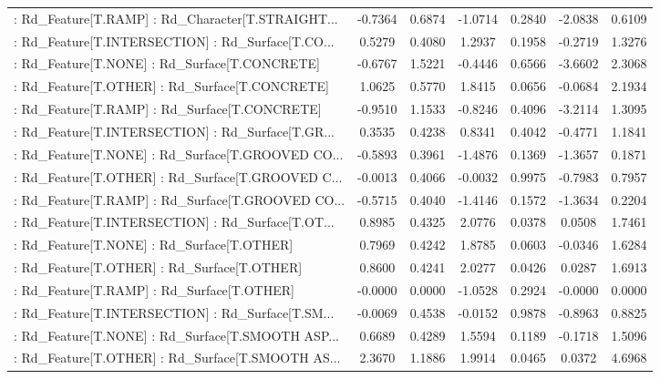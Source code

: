 \begin{longtable}{p{4cm}cccccc}
 : Rd\_Feature[T.RAMP] : Rd\_Character[T.STRAIGHT... & -0.7364 &    0.6874 & -1.0714 &       0.2840 & -2.0838 &  0.6109 \\
 : Rd\_Feature[T.INTERSECTION] : Rd\_Surface[T.CO... &  0.5279 &    0.4080 &  1.2937 &       0.1958 & -0.2719 &  1.3276 \\
 : Rd\_Feature[T.NONE] : Rd\_Surface[T.CONCRETE]     & -0.6767 &    1.5221 & -0.4446 &       0.6566 & -3.6602 &  2.3068 \\
 : Rd\_Feature[T.OTHER] : Rd\_Surface[T.CONCRETE]    &  1.0625 &    0.5770 &  1.8415 &       0.0656 & -0.0684 &  2.1934 \\
 : Rd\_Feature[T.RAMP] : Rd\_Surface[T.CONCRETE]     & -0.9510 &    1.1533 & -0.8246 &       0.4096 & -3.2114 &  1.3095 \\
 : Rd\_Feature[T.INTERSECTION] : Rd\_Surface[T.GR... &  0.3535 &    0.4238 &  0.8341 &       0.4042 & -0.4771 &  1.1841 \\
 : Rd\_Feature[T.NONE] : Rd\_Surface[T.GROOVED CO... & -0.5893 &    0.3961 & -1.4876 &       0.1369 & -1.3657 &  0.1871 \\
 : Rd\_Feature[T.OTHER] : Rd\_Surface[T.GROOVED C... & -0.0013 &    0.4066 & -0.0032 &       0.9975 & -0.7983 &  0.7957 \\
 : Rd\_Feature[T.RAMP] : Rd\_Surface[T.GROOVED CO... & -0.5715 &    0.4040 & -1.4146 &       0.1572 & -1.3634 &  0.2204 \\
 : Rd\_Feature[T.INTERSECTION] : Rd\_Surface[T.OT... &  0.8985 &    0.4325 &  2.0776 &       0.0378 &  0.0508 &  1.7461 \\
 : Rd\_Feature[T.NONE] : Rd\_Surface[T.OTHER]        &  0.7969 &    0.4242 &  1.8785 &       0.0603 & -0.0346 &  1.6284 \\
 : Rd\_Feature[T.OTHER] : Rd\_Surface[T.OTHER]       &  0.8600 &    0.4241 &  2.0277 &       0.0426 &  0.0287 &  1.6913 \\
 : Rd\_Feature[T.RAMP] : Rd\_Surface[T.OTHER]        & -0.0000 &    0.0000 & -1.0528 &       0.2924 & -0.0000 &  0.0000 \\
 : Rd\_Feature[T.INTERSECTION] : Rd\_Surface[T.SM... & -0.0069 &    0.4538 & -0.0152 &       0.9878 & -0.8963 &  0.8825 \\
 : Rd\_Feature[T.NONE] : Rd\_Surface[T.SMOOTH ASP... &  0.6689 &    0.4289 &  1.5594 &       0.1189 & -0.1718 &  1.5096 \\
 : Rd\_Feature[T.OTHER] : Rd\_Surface[T.SMOOTH AS... &  2.3670 &    1.1886 &  1.9914 &       0.0465 &  0.0372 &  4.6968 \\

\end{longtable}
